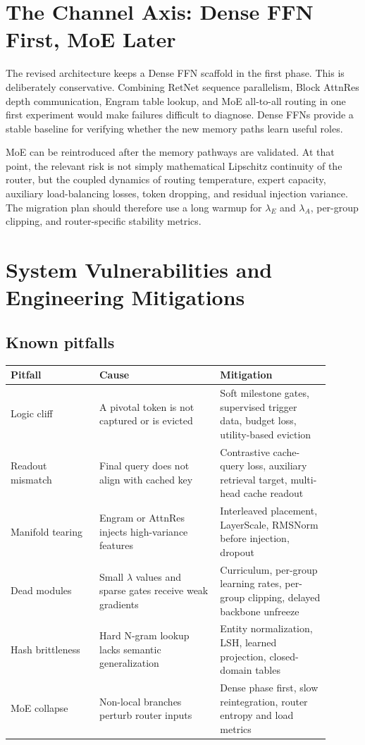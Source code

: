 \documentclass[11pt]{article}
\begin{document}
\section{The Channel Axis: Dense FFN First, MoE Later}

The revised architecture keeps a Dense FFN scaffold in the first phase. This is deliberately conservative. Combining RetNet sequence parallelism, Block AttnRes depth communication, Engram table lookup, and MoE all-to-all routing in one first experiment would make failures difficult to diagnose. Dense FFNs provide a stable baseline for verifying whether the new memory paths learn useful roles.

MoE can be reintroduced after the memory pathways are validated. At that point, the relevant risk is not simply mathematical Lipschitz continuity of the router, but the coupled dynamics of routing temperature, expert capacity, auxiliary load-balancing losses, token dropping, and residual injection variance. The migration plan should therefore use a long warmup for $\lambda_E$ and $\lambda_A$, per-group clipping, and router-specific stability metrics.

\section{System Vulnerabilities and Engineering Mitigations}

\subsection{Known pitfalls}

\begin{center}
\begin{tabular}{p{0.25\linewidth}p{0.34\linewidth}p{0.31\linewidth}}
\toprule
Pitfall & Cause & Mitigation \\
\midrule
Logic cliff & A pivotal token is not captured or is evicted & Soft milestone gates, supervised trigger data, budget loss, utility-based eviction \\
Readout mismatch & Final query does not align with cached key & Contrastive cache-query loss, auxiliary retrieval target, multi-head cache readout \\
Manifold tearing & Engram or AttnRes injects high-variance features & Interleaved placement, LayerScale, RMSNorm before injection, dropout \\
Dead modules & Small $\lambda$ values and sparse gates receive weak gradients & Curriculum, per-group learning rates, per-group clipping, delayed backbone unfreeze \\
Hash brittleness & Hard N-gram lookup lacks semantic generalization & Entity normalization, LSH, learned projection, closed-domain tables \\
MoE collapse & Non-local branches perturb router inputs & Dense phase first, slow reintegration, router entropy and load metrics \\
\bottomrule
\end{tabular}
\end{center}
\end{document}
